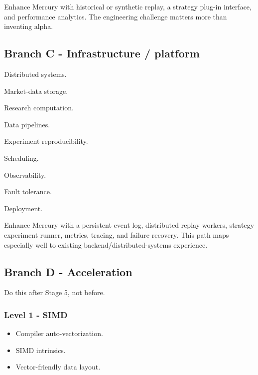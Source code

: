 \documentclass[11pt,letterpaper]{article}
\begin{document}
Enhance Mercury with historical or synthetic replay, a strategy plug-in interface, and performance analytics. The engineering challenge matters more than inventing alpha.

\subsection*{Branch C - Infrastructure / platform}

\begin{topics}

\item Distributed systems.

\item Market-data storage.

\item Research computation.

\item Data pipelines.

\item Experiment reproducibility.

\item Scheduling.

\item Observability.

\item Fault tolerance.

\item Deployment.

\end{topics}

Enhance Mercury with a persistent event log, distributed replay workers, strategy experiment runner, metrics, tracing, and failure recovery. This path maps especially well to existing backend/distributed-systems experience.

\subsection*{Branch D - Acceleration}

Do this after Stage 5, not before.

\subsubsection*{Level 1 - SIMD}

\begin{itemize}

\item Compiler auto-vectorization.

\item SIMD intrinsics.

\item Vector-friendly data layout.

\end{itemize}
\end{document}
